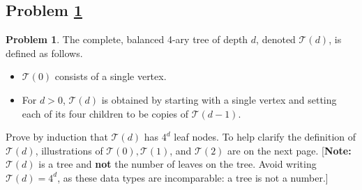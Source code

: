 \documentclass[11pt]{article}
\theoremstyle{definition}
\theoremstyle{definition}
\newtheorem{required}{Problem}
\theoremstyle{definition}
\begin{document}
\subsection{Problem \ref{Induction3}}
\begin{required} \label{Induction3}
The complete, balanced 4-ary tree of depth $d$, denoted $\mathcal{T}(d)$, is defined as follows. 
\begin{itemize}
\item $\mathcal{T}(0)$ consists of a single vertex.
\item For $d > 0$, $\mathcal{T}(d)$ is obtained by starting with a single vertex and setting each of its four children to be copies of $\mathcal{T}(d-1)$.
\end{itemize}

\noindent Prove by induction that $\mathcal{T}(d)$ has $4^{d}$ leaf nodes. To help clarify the definition of $\mathcal{T}(d)$, illustrations of $\mathcal{T}(0), \mathcal{T}(1)$, and $\mathcal{T}(2)$ are on the next page. [\textbf{Note:} $\mathcal{T}(d)$ is a tree and \textbf{not} the number of leaves on the tree. Avoid writing $\mathcal{T}(d) = 4^{d}$, as these data types are incomparable: a tree is not a number.]
\end{required}
\end{document}
